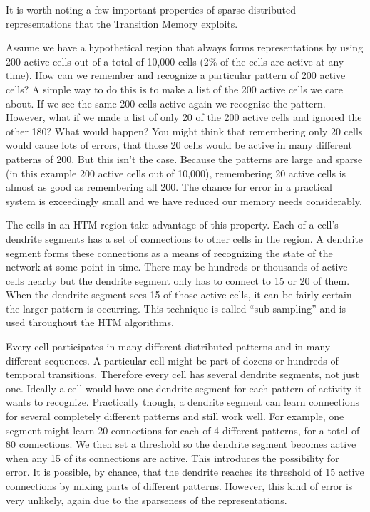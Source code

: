 It is worth noting a few important properties of sparse distributed
representations that the Transition Memory exploits.

Assume we have a hypothetical region that always forms representations
by using 200 active cells out of a total of 10,000 cells (2\% of the
cells are active at any time). How can we remember and recognize a
particular pattern of 200 active cells? A simple way to do this is to
make a list of the 200 active cells we care about. If we see the same
200 cells active again we recognize the pattern. However, what if we
made a list of only 20 of the 200 active cells and ignored the other
180? What would happen? You might think that remembering only 20 cells
would cause lots of errors, that those 20 cells would be active in
many different patterns of 200. But this isn't the case. Because the
patterns are large and sparse (in this example 200 active cells out of
10,000), remembering 20 active cells is almost as good as remembering
all 200. The chance for error in a practical system is exceedingly
small and we have reduced our memory needs considerably.

The cells in an HTM region take advantage of this property. Each of a
cell's dendrite segments has a set of connections to other cells in
the region. A dendrite segment forms these connections as a means of
recognizing the state of the network at some point in time. There may
be hundreds or thousands of active cells nearby but the dendrite
segment only has to connect to 15 or 20 of them. When the dendrite
segment sees 15 of those active cells, it can be fairly certain the
larger pattern is occurring. This technique is called ``sub-sampling''
and is used throughout the HTM algorithms.

Every cell participates in many different distributed patterns and in
many different sequences. A particular cell might be part of dozens or
hundreds of temporal transitions. Therefore every cell has several
dendrite segments, not just one. Ideally a cell would have one
dendrite segment for each pattern of activity it wants to
recognize. Practically though, a dendrite segment can learn
connections for several completely different patterns and still work
well. For example, one segment might learn 20 connections for each of
4 different patterns, for a total of 80 connections. We then set a
threshold so the dendrite segment becomes active when any 15 of its
connections are active. This introduces the possibility for error. It
is possible, by chance, that the dendrite reaches its threshold of 15
active connections by mixing parts of different patterns. However,
this kind of error is very unlikely, again due to the sparseness of
the representations.

